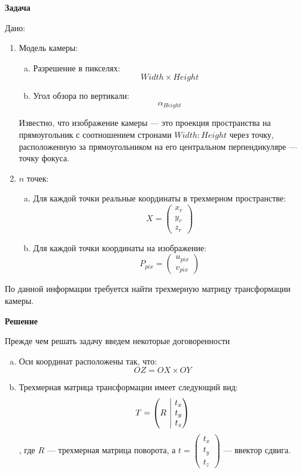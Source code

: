 \documentclass[12pt]{article}
\newenvironment{MyList}[1][4pt]{
  \begin{enumerate}[1.]
  \setlength{\parskip}{0pt}
  \setlength{\itemsep}{#1}
}{       
  \end{enumerate}
}
\newenvironment{InnerMyList}[1][0pt]{
  \vspace*{-0.5em}
  \begin{enumerate}[a)]
  \setlength{\parskip}{#1}
  \setlength{\itemsep}{0pt}
}{
  \end{enumerate}
}
\begin{document}
	\begin{center}
		{\bf Задача} 
	\end{center}
	Дано:
	\begin{MyList}
		\item
		Модель камеры:
		\begin{InnerMyList}
			\item 
			Разрешение в пикселях: 
			$$Width \times Height$$
			
			\item 
			Угол обзора по вертикали: 
			$$\alpha_{Height}$$
		\end{InnerMyList}
		Известно, что изображение камеры --- это проекция пространства на прямоугольник с соотношением стронами $Width : Height$ через точку, расположенную за прямоугольником на его центральном перпендикуляре --- точку фокуса. 
		
		\item
		$n$ точек:
		\begin{InnerMyList}
			\item 
			Для каждой точки реальные координаты в трехмерном пространстве: 
			$$ X = \begin{pmatrix} 
			x_r \\
			y_r \\
			z_r
			\end{pmatrix} $$
			
			\item 
			Для каждой точки координаты на изображение: 
			$$ P_{pix} = \begin{pmatrix} 
			u_{pix} \\
			v_{pix}
			\end{pmatrix} $$
		\end{InnerMyList}
	\end{MyList}
	По данной информации требуется найти трехмерную матрицу трансформации камеры.
	
	\begin{center}
		{\bf Решение} 
	\end{center}
	Прежде чем решать задачу введем некоторые договоренности
	\begin{InnerMyList}
		\item
		Оси координат расположены так, что:
		$$OZ = OX \times OY$$ 
		
		\item
		Трехмерная матрица трансформации имеет следующий вид:
		$$ T = \left(\begin{array}{@{}c|c@{}}
		R & \begin{matrix} t_x \\ t_y \\ t_z \end{matrix}
		\end{array}\right) $$
		, где $R$ --- трехмерная матрица поворота, а $t = \begin{pmatrix} 
		t_x \\
		t_y \\
		t_z
		\end{pmatrix}$ --- ввектор сдвига.
	\end{InnerMyList}
	
\end{document}
